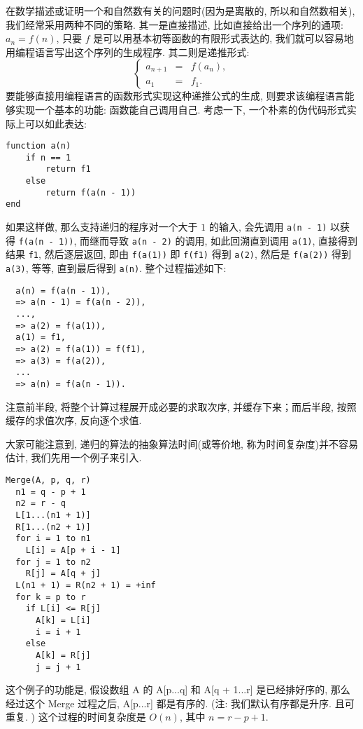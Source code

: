 \documentclass[a4paper]{ctexart}
\theoremstyle{definition}
\theoremstyle{definition}
\begin{document}
在数学描述或证明一个和自然数有关的问题时(因为是离散的, 所以和自然数相关),
我们经常采用两种不同的策略. 其一是直接描述,
比如直接给出一个序列的通项: $a_n = f(n)$, 只要 $f$
是可以用基本初等函数的有限形式表达的, 我们就可以容易地用编程语言写出这个序列的生成程序.
其二则是递推形式:
\begin{equation}
  \left\{
  \begin{array}{rcl}
    a_{n + 1} &=& f(a_n), \\
    a_1 &=& f_1. 
  \end{array}\right.
  \label{eq::recursion_formula}
\end{equation}
要能够直接用编程语言的函数形式实现这种递推公式的生成,
则要求该编程语言能够实现一个基本的功能: 函数能自己调用自己.
考虑一下, 一个朴素的伪代码形式实际上可以如此表达:
\begin{verbatim}
function a(n)
    if n == 1
        return f1
    else
        return f(a(n - 1))
end
\end{verbatim}
如果这样做, 那么支持递归的程序对一个大于 $1$ 的输入, 会先调用
\verb|a(n - 1)| 以获得 \verb|f(a(n - 1))|, 而继而导致 \verb|a(n - 2)|
的调用, 如此回溯直到调用 \verb|a(1)|, 直接得到结果 \verb|f1|, 然后逐层返回, 即由
\verb|f(a(1))| 即 \verb|f(f1)| 得到 \verb|a(2)|, 然后是 \verb|f(a(2))| 得到
\verb|a(3)|, 等等, 直到最后得到 \verb|a(n)|. 整个过程描述如下:
\begin{verbatim}
  a(n) = f(a(n - 1)),
  => a(n - 1) = f(a(n - 2)),
  ...,
  => a(2) = f(a(1)),
  a(1) = f1,
  => a(2) = f(a(1)) = f(f1),
  => a(3) = f(a(2)),
  ...
  => a(n) = f(a(n - 1)).
\end{verbatim}

注意前半段, 将整个计算过程展开成必要的求取次序, 并缓存下来；而后半段, 按照缓存的求值次序, 
反向逐个求值.

大家可能注意到, 递归的算法的抽象算法时间(或等价地, 称为时间复杂度)并不容易估计, 我们先用一个例子来引入. 
\begin{verbatim}
Merge(A, p, q, r)
  n1 = q - p + 1
  n2 = r - q 
  L[1...(n1 + 1)]
  R[1...(n2 + 1)]
  for i = 1 to n1
    L[i] = A[p + i - 1]
  for j = 1 to n2
    R[j] = A[q + j]
  L(n1 + 1) = R(n2 + 1) = +inf
  for k = p to r
    if L[i] <= R[j]
      A[k] = L[i]
      i = i + 1
    else
      A[k] = R[j]
      j = j + 1
\end{verbatim}    

这个例子的功能是, 假设数组 A 的 A[p...q] 和 A[q + 1...r] 是已经排好序的, 
那么经过这个 Merge 过程之后, A[p...r] 都是有序的. (注: 我们默认有序都是升序. 且可重复. )
这个过程的时间复杂度是 $O(n)$, 其中 $n = r - p + 1$.
\end{document}
